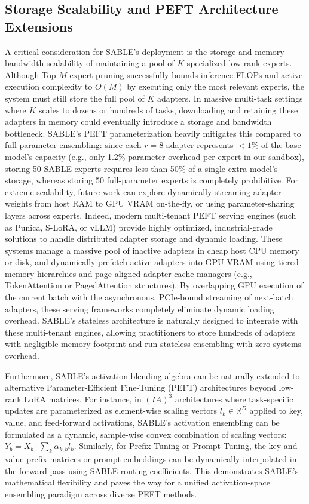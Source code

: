 \subsection{Storage Scalability and PEFT Architecture Extensions}
A critical consideration for SABLE's deployment is the storage and memory bandwidth scalability of maintaining a pool of $K$ specialized low-rank experts. Although Top-$M$ expert pruning successfully bounds inference FLOPs and active execution complexity to $O(M)$ by executing only the most relevant experts, the system must still store the full pool of $K$ adapters. In massive multi-task settings where $K$ scales to dozens or hundreds of tasks, downloading and retaining these adapters in memory could eventually introduce a storage and bandwidth bottleneck. SABLE's PEFT parameterization heavily mitigates this compared to full-parameter ensembling: since each $r=8$ adapter represents $<1\%$ of the base model's capacity (e.g., only 1.2\% parameter overhead per expert in our sandbox), storing 50 SABLE experts requires less than 50\% of a single extra model's storage, whereas storing 50 full-parameter experts is completely prohibitive. For extreme scalability, future work can explore dynamically streaming adapter weights from host RAM to GPU VRAM on-the-fly, or using parameter-sharing layers across experts. Indeed, modern multi-tenant PEFT serving engines (such as Punica, S-LoRA, or vLLM) provide highly optimized, industrial-grade solutions to handle distributed adapter storage and dynamic loading. These systems manage a massive pool of inactive adapters in cheap host CPU memory or disk, and dynamically prefetch active adapters into GPU VRAM using tiered memory hierarchies and page-aligned adapter cache managers (e.g., TokenAttention or PagedAttention structures). By overlapping GPU execution of the current batch with the asynchronous, PCIe-bound streaming of next-batch adapters, these serving frameworks completely eliminate dynamic loading overhead. SABLE's stateless architecture is naturally designed to integrate with these multi-tenant engines, allowing practitioners to store hundreds of adapters with negligible memory footprint and run stateless ensembling with zero systems overhead.

Furthermore, SABLE's activation blending algebra can be naturally extended to alternative Parameter-Efficient Fine-Tuning (PEFT) architectures beyond low-rank LoRA matrices. For instance, in $(IA)^3$ architectures where task-specific updates are parameterized as element-wise scaling vectors $l_k \in \mathbb{R}^D$ applied to key, value, and feed-forward activations, SABLE's activation ensembling can be formulated as a dynamic, sample-wise convex combination of scaling vectors: $Y_b = X_b \cdot \sum_k \alpha_{k, b} l_k$. Similarly, for Prefix Tuning or Prompt Tuning, the key and value prefix matrices or prompt embeddings can be dynamically interpolated in the forward pass using SABLE routing coefficients. This demonstrates SABLE's mathematical flexibility and paves the way for a unified activation-space ensembling paradigm across diverse PEFT methods.

